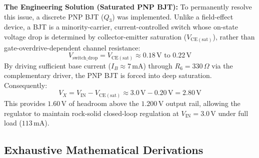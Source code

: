 \documentclass[11pt,a4paper]{article}
\begin{document}
\textbf{The Engineering Solution (Saturated PNP BJT):}
To permanently resolve this issue, a discrete PNP BJT ($Q_3$) was implemented. Unlike a field-effect device, a BJT is a minority-carrier, current-controlled switch whose on-state voltage drop is determined by collector-emitter saturation ($V_{\mathrm{CE(sat)}}$), rather than gate-overdrive-dependent channel resistance:
\begin{equation}
    V_{\mathrm{switch\_drop}} = V_{\mathrm{CE(sat)}} \approx 0.18\,\mathrm{V}\text{ to }0.22\,\mathrm{V}
\end{equation}
By driving sufficient base current ($I_B \approx 7\,\mathrm{mA}$) through $R_6 = 330\,\Omega$ via the complementary driver, the PNP BJT is forced into deep saturation. Consequently:
\begin{equation}
    V_X = V_{\mathrm{IN}} - V_{\mathrm{CE(sat)}} \approx 3.0\,\mathrm{V} - 0.20\,\mathrm{V} = 2.80\,\mathrm{V}
\end{equation}
This provides $1.60\,\mathrm{V}$ of headroom above the $1.200\,\mathrm{V}$ output rail, allowing the regulator to maintain rock-solid closed-loop regulation at $V_{\mathrm{IN}} = 3.0\,\mathrm{V}$ under full load ($113\,\mathrm{mA}$).

\subsection{Exhaustive Mathematical Derivations}
\end{document}
